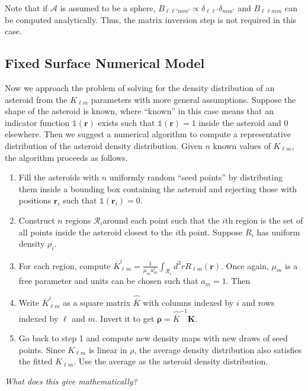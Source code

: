 \documentclass{aastex631}
\newcommand{\jtd}[1]{{\color{red}\textit{#1}}}
\begin{document}
Note that if $\mathcal{A}$ is assumed to be a sphere, $B_{\ell \ell' m m'} \propto \delta_{\ell \ell'} \delta_{m m'}$ and $B_{\ell \ell m m}$ can be computed analytically. Thus, the matrix inversion step is not required in this case.

\subsection{Fixed Surface Numerical Model}
\label{sec:numerical-density}
Now we approach the problem of solving for the density distribution of an asteroid from the $K_{\ell m}$ parameters with more general assumptions. Suppose the shape of the asteroid is known, where ``known'' in this case means that an indicator function $\mathds{1}(\bm r)$ exists such that $\mathds{1}(\bm r) = 1$  inside the asteroid and 0 elsewhere. Then we suggest a numerical algorithm to compute a representative distribution of the asteroid density distribution. Given $n$ known values of $K_{\ell m}$, the algorithm proceeds as follows.
\begin{enumerate}
\item Fill the asteroids with $n$ uniformly random ``seed points'' by distributing them inside a bounding box containing the asteroid and rejecting those with positions $\bm r_i$ such that $\mathds{1}(\bm r_i) = 0.$
\item Construct $n$ regions $\mathcal{R}_i$around each point such that the $i$th region is the set of all points inside the asteroid closest to the $i$th point. Suppose $R_i$ has uniform density $\rho_i$.
\item For each region, compute $\overline K_{\ell m}^i = \frac{1}{\mu_m a_m^\ell}\int_{\mathcal{R}_i} d^3 r R_{\ell m}(\bm r)$. Once again, $\mu_m$ is a free parameter and units can be chosen such that $a_m=1$. Then %
\item Write $\overline K_{\ell m}^i$ as a square matrix $\hat{\overline K}$ with columns indexed by $i$ and rows indexed by $\ell$ and $m$. Invert it to get $\bm \rho = \hat {\overline K}^{-1} \bm K$.
\item Go back to step 1 and compute new density maps with new draws of seed points. Since $K_{\ell m}$ is linear in $\rho$, the average density distribution also satisfies the fitted $K_{\ell m}$. Use the average as the asteroid density distribution.
\end{enumerate}

\jtd{What does this give mathematically?}
\end{document}
